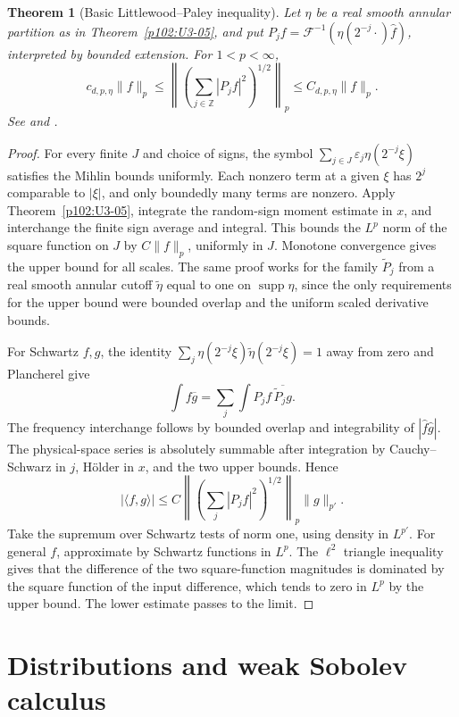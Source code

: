 \documentclass[11pt,oneside,openany]{book}
\newtheorem{theorem}{Theorem}[chapter]
\theoremstyle{definition}
\theoremstyle{remark}
\begin{document}
\begin{theorem}[Basic Littlewood--Paley inequality]
\label{p102:U3-06}
Let \(\eta\) be a real smooth annular partition as in Theorem~\ref{p102:U3-05}, and put \(P_j f=\mathcal F^{-1}(\eta(2^{-j}\cdot)\widehat f)\), interpreted by bounded extension. For \(1<p<\infty\),
\[
 c_{d,p,\eta}\|f\|_p\le
 \left\|\left(\sum_{j\in\mathbb Z}|P_j f|^2\right)^{1/2}\right\|_p
 \le C_{d,p,\eta}\|f\|_p .
\]
See \cite[\S6.1.1]{grafakos} and \cite[\S10.8]{leoni}.
\end{theorem}
\begin{proof}
For every finite \(J\) and choice of signs, the symbol
\(\sum_{j\in J}\varepsilon_j\eta(2^{-j}\xi)\) satisfies the Mihlin bounds uniformly. Each nonzero term at a given \(\xi\) has \(2^j\) comparable to \(|\xi|\), and only boundedly many terms are nonzero. Apply Theorem~\ref{p102:U3-05}, integrate the random-sign moment estimate in \(x\), and interchange the finite sign average and integral. This bounds the \(L^p\) norm of the square function on \(J\) by \(C\|f\|_p\), uniformly in \(J\). Monotone convergence gives the upper bound for all scales. The same proof works for the family \(\widetilde P_j\) from a real smooth annular cutoff \(\widetilde\eta\) equal to one on \(\operatorname{supp}\eta\), since the only requirements for the upper bound were bounded overlap and the uniform scaled derivative bounds.

For Schwartz \(f,g\), the identity \(\sum_j\eta(2^{-j}\xi)\widetilde\eta(2^{-j}\xi)=1\) away from zero and Plancherel give
\[
 \int f\overline g=\sum_j\int P_j f\,\overline{\widetilde P_j g}.
\]
The frequency interchange follows by bounded overlap and integrability of \(|\widehat f\widehat g|\). The physical-space series is absolutely summable after integration by Cauchy--Schwarz in \(j\), Hölder in \(x\), and the two upper bounds. Hence
\[
 |\langle f,g\rangle|
 \le C\left\|\left(\sum_j|P_j f|^2\right)^{1/2}\right\|_p\|g\|_{p'}.
\]
Take the supremum over Schwartz tests of norm one, using density in \(L^{p'}\). For general \(f\), approximate by Schwartz functions in \(L^p\). The \(\ell^2\) triangle inequality gives that the difference of the two square-function magnitudes is dominated by the square function of the input difference, which tends to zero in \(L^p\) by the upper bound. The lower estimate passes to the limit.
\end{proof}
\chapter{Distributions and weak Sobolev calculus}
\label{ch:p102-u4}
\end{document}

